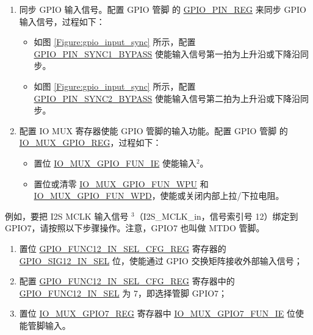 \documentclass[main\_\_CN.tex]{subfiles}
\begin{document}
\begin{enumerate}
    \item 同步 GPIO 输入信号。配置 GPIO 管脚  的 \hyperref[regdesc:GPIOPINNREG]{GPIO\_PIN\_REG} 来同步 GPIO 输入信号，过程如下：
    \begin{itemize}
        \item 如图 \ref{Figure:gpio_input_sync} 所示，配置 \hyperref[fielddesc:GPIOPINNSYNC1BYPASS]{GPIO\_PIN\_SYNC1\_BYPASS} 使能输入信号第一拍为上升沿或下降沿同步。
        \item 如图 \ref{Figure:gpio_input_sync} 所示，配置 \hyperref[fielddesc:GPIOPINNSYNC2BYPASS]{GPIO\_PIN\_SYNC2\_BYPASS} 使能输入信号第二拍为上升沿或下降沿同步。
    \end{itemize}
    \item 配置 IO MUX 寄存器使能 GPIO 管脚的输入功能。配置 GPIO 管脚  的 \hyperref[regdesc:IOMUXGPIONREG]{IO\_MUX\_GPIO\_REG}，过程如下：
    \begin{itemize}
        \item 置位 \hyperref[fielddesc:IOMUXGPIONFUNIE]{IO\_MUX\_GPIO\_FUN\_IE} 使能输入\hyperref[input-note-2]{$^2$}。
        \item 置位或清零 \hyperref[fielddesc:IOMUXGPIONFUNWPU]{IO\_MUX\_GPIO\_FUN\_WPU} 和 \hyperref[fielddesc:IOMUXGPIONFUNWPD]{IO\_MUX\_GPIO\_FUN\_WPD}，使能或关闭内部上拉/下拉电阻。
    \end{itemize}
\end{enumerate}

例如，要把 I2S MCLK 输入信号 \hyperref[input-note-3]{$^3$}（I2S\_MCLK\_in，信号索引号 12）绑定到 GPIO7，请按照以下步骤操作。注意，GPIO7 也叫做 MTDO 管脚。

\begin{enumerate}
\item 置位 \hyperref[regdesc:GPIOFUNCNINSELCFGREG]{GPIO\_FUNC12\_IN\_SEL\_CFG\_REG} 寄存器的 \hyperref[fielddesc:GPIOSIGNINSEL]{GPIO\_SIG12\_IN\_SEL} 位，使能通过 GPIO 交换矩阵接收外部输入信号；
\item 配置 \hyperref[regdesc:GPIOFUNCNINSELCFGREG]{GPIO\_FUNC12\_IN\_SEL\_CFG\_REG} 寄存器中的 \hyperref[fielddesc:GPIOFUNCNINSEL]{GPIO\_FUNC12\_IN\_SEL} 为 7，即选择管脚 GPIO7；
\item 置位 \hyperref[regdesc:IOMUXGPIONREG]{IO\_MUX\_GPIO7\_REG} 寄存器中 \hyperref[fielddesc:IOMUXGPIONFUNIE]{IO\_MUX\_GPIO7\_FUN\_IE} 位使能管脚输入。
\end{enumerate}
\end{document}
